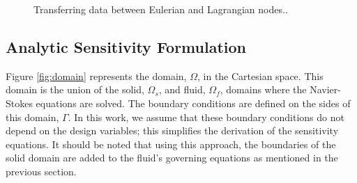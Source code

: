 \documentclass{aiaa-pretty}
\begin{document}
%
\begin{figure}[H]
	\centering
	\quad
	\quad
	\caption{Transferring data between Eulerian and Lagrangian nodes..}
	\label{fig:mappingDataE2L}
\end{figure}
%

\subsection{Analytic Sensitivity Formulation}
Figure \ref{fig:domain} represents the domain, $\Omega$, in the Cartesian space. This domain is the union of the solid, $\Omega_s$, and fluid, $\Omega_f$, domains where the Navier-Stokes equations are solved. The boundary conditions are defined on the sides of this domain, $\Gamma$. In this work, we assume that these boundary conditions do not depend on the design variables; this simplifies the derivation of the sensitivity equations. It should be noted that using this approach, the boundaries of the solid domain are added to the fluid's governing equations as mentioned in the previous section.
\end{document}
